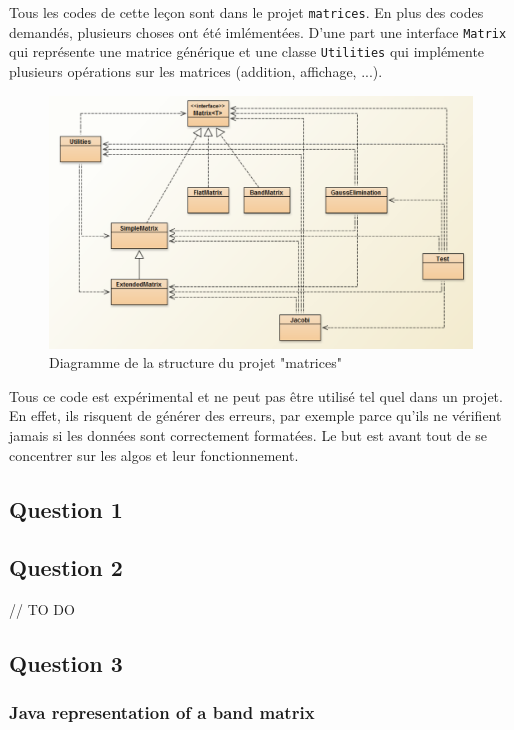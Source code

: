 Tous les codes de cette leçon sont dans le projet \texttt{matrices}. En plus des codes demandés, plusieurs choses ont été imlémentées. D'une part une interface \texttt{Matrix} qui représente une matrice générique et une classe \texttt{Utilities} qui implémente plusieurs opérations sur les matrices (addition, affichage, ...).

\begin{figure}[H]
	\caption{\label{struc} Diagramme de la structure du projet "matrices"}
	\centering
	\includegraphics[scale = 0.6]{Figures/2_structure.png}
\end{figure}

Tous ce code est expérimental et ne peut pas être utilisé tel quel dans un projet. En effet, ils risquent de générer des erreurs, par exemple parce qu'ils ne vérifient jamais si les données sont correctement formatées. Le but est avant tout de se concentrer sur les algos et leur fonctionnement.

\subsection{Question 1}

\subsection{Question 2}

// TO DO

\subsection{Question 3}

\subsubsection{Java representation of a band matrix}

